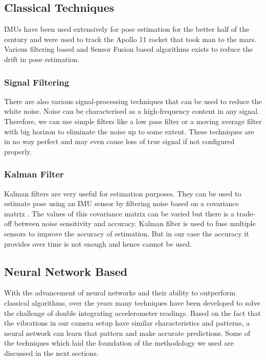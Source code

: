 \subsection{Classical Techniques}
IMUs have been used extensively for pose estimation for the better half of the century and were used to track the Apollo 11 rocket that took man to the mars. Various filtering based and Sensor Fusion based algorithms exists to reduce the drift in pose estimation. 

\subsubsection{Signal Filtering}
There are also various signal-processing techniques that can be used to reduce the white noise. Noise can be characterised as a high-frequency content in any signal. Therefore, we can use simple filters like a low pass filter or a moving average filter with big horizon to eliminate the noise up to some extent. These techniques are in no way perfect and may even cause loss of true signal if not configured properly.

\subsubsection{Kalman Filter}
Kalman filters are very useful for estimation purposes. They can be used to estimate pose using an IMU sensor by filtering noise based on a covariance matrix \citep{ferdinando2012embedded}. The values of this covariance matrix can be varied but there is a trade-off between noise sensitivity and accuracy. Kalman filter is used to fuse multiple sensors to improve the accuracy of estimation. But in our case the accuracy it provides over time is not enough and hence cannot be used.

\subsection{Neural Network Based}
With the advancement of neural networks and their ability to outperform classical algorithms, over the years many techniques have been developed to solve the challenge of double integrating accelerometer readings. Based on the fact that the vibrations in our camera setup have similar characteristics and patterns, a neural network can learn that pattern and make accurate predictions. Some of the techniques which laid the foundation of the methodology we used are discussed in the next sections.

